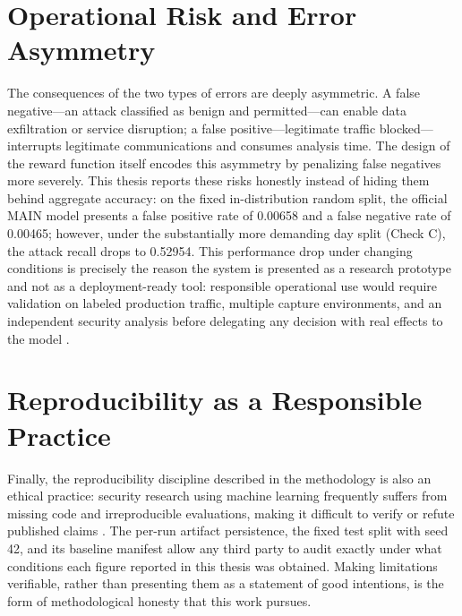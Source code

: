 \section{Operational Risk and Error Asymmetry}
The consequences of the two types of errors are deeply asymmetric. A false negative---an attack classified as benign and permitted---can enable data exfiltration or service disruption; a false positive---legitimate traffic blocked---interrupts legitimate communications and consumes analysis time. The design of the reward function itself encodes this asymmetry by penalizing false negatives more severely. This thesis reports these risks honestly instead of hiding them behind aggregate accuracy: on the fixed in-distribution random split, the official MAIN model presents a false positive rate of 0.00658 and a false negative rate of 0.00465; however, under the substantially more demanding day split (Check C), the attack recall drops to 0.52954. This performance drop under changing conditions is precisely the reason the system is presented as a research prototype and not as a deployment-ready tool: responsible operational use would require validation on labeled production traffic, multiple capture environments, and an independent security analysis before delegating any decision with real effects to the model \parencite{Apruzzese2022CrossEvaluationNIDS,SommerPaxson2010ClosedWorld}.

\section{Reproducibility as a Responsible Practice}
Finally, the reproducibility discipline described in the methodology is also an ethical practice: security research using machine learning frequently suffers from missing code and irreproducible evaluations, making it difficult to verify or refute published claims \parencite{Olszewski2023ReproSecurityML,Arp2020DosDontsMLSecurity}. The per-run artifact persistence, the fixed test split with seed 42, and its baseline manifest allow any third party to audit exactly under what conditions each figure reported in this thesis was obtained. Making limitations verifiable, rather than presenting them as a statement of good intentions, is the form of methodological honesty that this work pursues.
